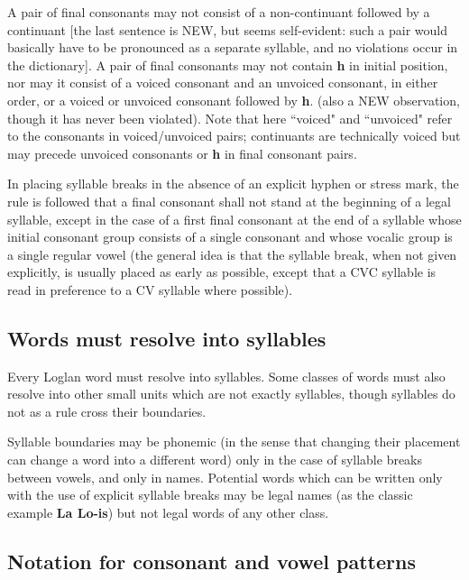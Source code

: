 \documentclass[12pt]{book}
\begin{document}
\begin{enumerate}
A pair of final consonants may not consist of a non-continuant followed by a continuant [the last sentence is NEW, but seems self-evident:  such a pair would basically have to be pronounced as a separate syllable, and no violations occur in the dictionary].  A pair of final consonants may not contain {\bf h} in initial position, nor may it consist of a voiced consonant and an unvoiced consonant, in either order, or a voiced or unvoiced consonant followed by {\bf h}.  (also a NEW observation, though it has never been violated).  Note that here ``voiced" and ``unvoiced" refer to the consonants in voiced/unvoiced pairs;  continuants are technically voiced but may precede unvoiced consonants or {\bf h} in final consonant pairs.

In placing syllable breaks in the absence of an explicit hyphen or stress mark, the rule is followed that a final consonant shall not stand at the beginning of a legal syllable, except in the case of a first final consonant at the end of a syllable whose initial consonant group consists of a single consonant and whose vocalic group is a single regular vowel (the general idea is that the syllable break, when not given explicitly, is usually placed as early as possible, except that a CVC syllable is read in preference to a CV syllable where possible).   

\end{enumerate}

\subsection{Words must resolve into syllables}

Every Loglan word must resolve into syllables.  Some classes of words must also resolve into other small units which are not exactly syllables, though syllables do not as a rule cross their boundaries.

Syllable boundaries may be phonemic (in the sense that changing their placement can change a word into a different word) only in the case of syllable breaks between vowels, and only in names.   Potential words which can be written only with the use of explicit syllable breaks may be legal names (as the classic example {\bf La Lo-is}) but not legal words of any other class.

\subsection{Notation for consonant and vowel patterns}
\end{document}
